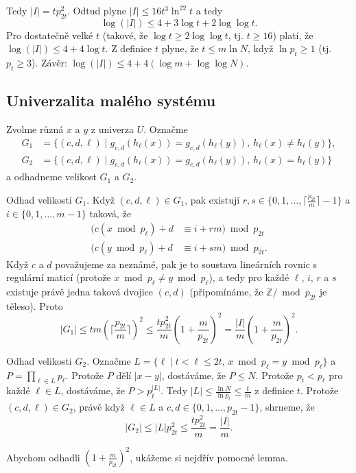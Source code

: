 \documentclass[a4paper,12pt]{article}
\begin{document}
Tedy $|I|=tp_{2t}^2$.   
Odtud plyne $|I|\le 16t^3\ln^22t$ a tedy 
$$\log(|I|)\le 4+3\log t+2\log\log t.$$
Pro dostatečně velké $t$ (takové, že $\log t\ge 2\log\log 
t$, tj. $t\ge 16$) platí, 
že $\log(|I|)\le 4+4\log t$.  Z definice $t$ plyne, 
že $t\le m\ln N$, když $\ln p_t\ge 1$ (tj.  $p_t\ge 3$).\newline 
Závěr: $\log(|I|)\le 4+4(\log m+\log\log N)$. 

\subsection{
Univerzalita malého systému
}

Zvolme různá $x$ a $y$ z univerza $U$. 
Označme
\begin{align*} G_1&=\{(c,d,\ell )\mid g_{c,d}(h_{\ell}(x))=g_{c,d}(h_{\ell}
(y)),\,h_{\ell}(x)\ne h_{\ell}(y)\},\\
G_2&=\{(c,d,\ell )\mid g_{c,d}(h_{\ell}(x))=g_{c,d}(h_{\ell}(y)),\,
h_{\ell}(x)=h_{\ell}(y)\}\end{align*}
a odhadneme velikost $G_1$ a $G_2$. 

Odhad velikosti $G_1$. Když $(c,d,\ell )\in G_1$, pak 
existují $r,s\in \{0,1,\dots,\lceil\frac {p_{2t}}m\rceil -1\}$ a $
i\in \{0,1,\dots,m-1\}$ 
taková, že 
\begin{align*}(c(x\bmod p_{\ell})+d&\equiv i+rm)\bmod p_{2t}\\
(c(y\bmod p_{\ell})+d&\equiv i+sm)\bmod p_{2t}.\end{align*}
Když $c$ a $d$ považujeme za neznámé, pak je to  
soustava lineár\-ních rovnic s regulární maticí (protože 
$x\bmod p_{\ell}\ne y\bmod p_{\ell}$), a tedy pro každé $\ell$, $
i$, $r$ a $s$ 
existuje právě jedna taková dvojice $(c,d)$ (připomínáme, že $\mathbb Z/\bmod p_{2t}$ je těleso). Proto 
$$|G_1|\le tm(\lceil\frac {p_{2t}}m\rceil )^2\le\frac {tp_{2t}^2}
m(1+\frac m{p_{2t}})^2=\frac {|I|}m(1+\frac m{p_{2t}})^2.$$

Odhad velikosti $G_2$. Označme 
$L=\{\ell\mid t<\ell\le 2t,\,x\bmod p_{\ell}=y\bmod p_{\ell}\}$ a $
P=\prod_{\ell\in L}p_{\ell}$. 
Protože $P$ dělí $|x-y|$, dostáváme, že $P\le N$. Protože 
$p_t<p_{\ell}$ pro každé $\ell\in L$, dostáváme, že $
P>p_t^{|L|}$. Tedy 
$|L|\le\frac {\ln N}{\ln p_t}\le\frac tm$ z definice $t$. Protože $
(c,d,\ell )\in G_2$, právě 
když $\ell\in L$ a $c,d\in \{0,1,\dots,p_{2t}-1\}$, shrneme, že 
$$|G_2|\le |L|p_{2t}^2\le\frac {tp_{2t}^2}m=\frac {|I|}m.$$

Abychom odhadli $(1+\frac m{p_{2t}})^2$, ukážeme si nejdřív 
pomocné lem\-ma.
\end{document}
